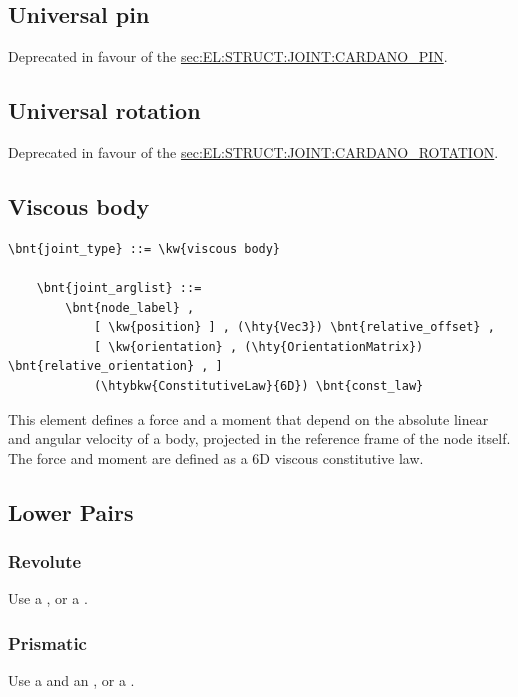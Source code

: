 \subsection{Universal pin}
\label{sec:EL:STRUCT:JOINT:UNIVERSAL_PIN}
Deprecated in favour of the
\hyperref{\kw{cardano pin}}{\kw{cardano pin} (see Section~}{)}{sec:EL:STRUCT:JOINT:CARDANO_PIN}.



\subsection{Universal rotation}
\label{sec:EL:STRUCT:JOINT:UNIVERSAL_ROTATION}
Deprecated in favour of the
\hyperref{\kw{cardano rotation}}{\kw{cardano rotation} (see Section~}{)}{sec:EL:STRUCT:JOINT:CARDANO_ROTATION}.

\subsection{Viscous body}
\label{sec:EL:STRUCT:JOINT:VISCOUS_BODY}
\begin{Verbatim}[commandchars=\\\{\}]
    \bnt{joint_type} ::= \kw{viscous body}

    \bnt{joint_arglist} ::=
        \bnt{node_label} ,
            [ \kw{position} ] , (\hty{Vec3}) \bnt{relative_offset} ,
            [ \kw{orientation} , (\hty{OrientationMatrix}) \bnt{relative_orientation} , ]
            (\htybkw{ConstitutiveLaw}{6D}) \bnt{const_law}
\end{Verbatim}
This element defines a force and a moment that depend on the absolute 
linear and angular velocity of a body, projected in the reference frame
of the node itself.
The force and moment are defined as a 6D viscous constitutive law.


\subsection{Lower Pairs}

\subsubsection{Revolute}
Use a , or a .

\subsubsection{Prismatic}
Use a  and an , or a .

